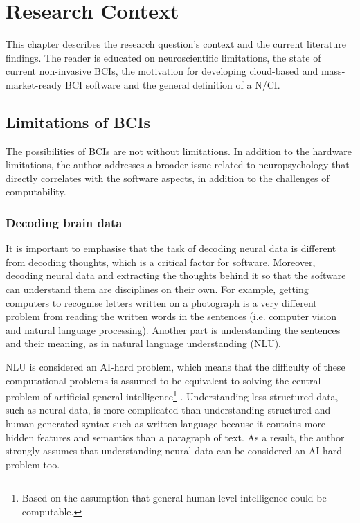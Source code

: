 \chapter{Research Context}
\graphicspath{{Chapter2/Figs/}{Chapter2/Figs/}}

This chapter describes the research question's context and the current literature findings. The reader is educated on neuroscientific limitations, the state of current non-invasive BCIs, the motivation for developing cloud-based and mass-market-ready BCI software and the general definition of a N/CI.

\section{Limitations of BCIs}
\label{chapter2-limitations-of-bcis}

The possibilities of BCIs are not without limitations. In addition to the hardware limitations, the author addresses a broader issue related to neuropsychology that directly correlates with the software aspects, in addition to the challenges of computability.

\subsection{Decoding brain data}
\label{chapter2-decoding-brain-data}

It is important to emphasise that the task of decoding neural data is different from decoding thoughts, which is a critical factor for software. Moreover, decoding neural data and extracting the thoughts behind it so that the software can understand them are disciplines on their own. For example, getting computers to recognise letters written on a photograph is a very different problem from reading the written words in the sentences (i.e. computer vision and natural language processing). Another part is understanding the sentences and their meaning, as in natural language understanding (NLU).

NLU is considered an AI-hard problem, which means that the difficulty of these computational problems is assumed to be equivalent to solving the central problem of artificial general intelligence\footnote{Based on the assumption that general human-level intelligence could be computable.} \citep{demasi_theoretical_2010}. Understanding less structured data, such as neural data, is more complicated than understanding structured and human-generated syntax such as written language because it contains more hidden features and semantics than a paragraph of text. As a result, the author strongly assumes that understanding neural data can be considered an AI-hard problem too.

